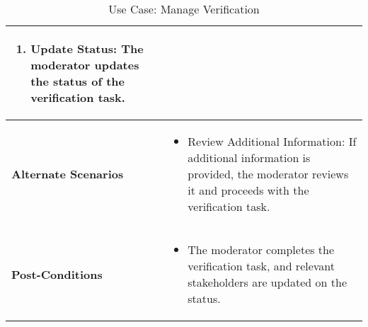 \begin{table}[!ht]
\begin{tabularx}{\textwidth}{|l|X|}
\begin{enumerate}[label=\arabic*.,itemsep=0pt]
            \item Update Status: The moderator updates the status of the verification task.
        \end{enumerate} \\
        \hline
        \textbf{Alternate Scenarios} & 
        \begin{itemize}[label=--,itemsep=0pt]
            \item Review Additional Information: If additional information is provided, the moderator reviews it and proceeds with the verification task.
        \end{itemize} \\
        \hline
        \textbf{Post-Conditions} & 
        \begin{itemize}[label=--,itemsep=0pt]
            \item The moderator completes the verification task, and relevant stakeholders are updated on the status.
        \end{itemize} \\
        \hline
    \end{tabularx}
    \caption{Use Case: Manage Verification}
    \label{tab:use-case-manage-verification}
\end{table}


